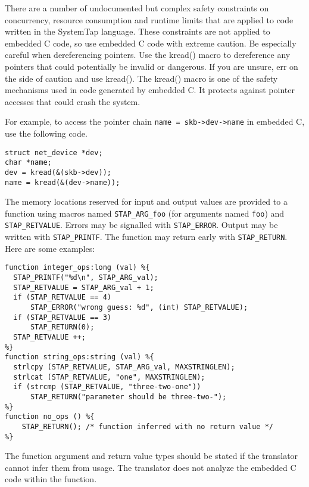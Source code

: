 \documentclass[twoside,english]{article}
\newenvironment{vindent}
{\begin{list}{}{\setlength{\listparindent}{6pt}}
\item[]}
{\end{list}}
\begin{document}
There are a number of undocumented but complex safety constraints on concurrency,
resource consumption and runtime limits that are applied to code written
in the SystemTap language. These constraints are not applied to embedded
C code, so use embedded C code with extreme caution. Be especially
careful when dereferencing pointers. Use the kread() macro to dereference
any pointers that could potentially be invalid or dangerous. If you are unsure,
err on the side of caution and use kread(). The kread() macro is one of the
safety mechanisms used in code generated by embedded C. It protects against
pointer accesses that could crash the system.

For example, to access the pointer chain \texttt{name = skb->dev->name} in
embedded C, use the following code.

\begin{vindent}
\begin{verbatim}
struct net_device *dev;
char *name;
dev = kread(&(skb->dev));
name = kread(&(dev->name));
\end{verbatim}
\end{vindent}

The memory locations reserved for input and output values are provided
to a function using macros named
\texttt{STAP\_ARG\_foo} (for arguments named
\texttt{foo}) and \texttt{STAP\_RETVALUE}.
Errors may be signalled with \texttt{STAP\_ERROR}. Output may be written
with \texttt{STAP\_PRINTF}. The function may return                       early with \texttt{STAP\_RETURN}.  Here are some examples:

\begin{vindent}
\begin{verbatim}
function integer_ops:long (val) %{
  STAP_PRINTF("%d\n", STAP_ARG_val);
  STAP_RETVALUE = STAP_ARG_val + 1;
  if (STAP_RETVALUE == 4)
      STAP_ERROR("wrong guess: %d", (int) STAP_RETVALUE);
  if (STAP_RETVALUE == 3)
      STAP_RETURN(0);
  STAP_RETVALUE ++;
%}
function string_ops:string (val) %{
  strlcpy (STAP_RETVALUE, STAP_ARG_val, MAXSTRINGLEN);
  strlcat (STAP_RETVALUE, "one", MAXSTRINGLEN);
  if (strcmp (STAP_RETVALUE, "three-two-one"))
      STAP_RETURN("parameter should be three-two-");
%}
function no_ops () %{
    STAP_RETURN(); /* function inferred with no return value */
%}
\end{verbatim}
\end{vindent}

The function argument and return value types should be stated if the
translator cannot infer them from usage.  The translator does not
analyze the embedded C code within the function.
\end{document}

